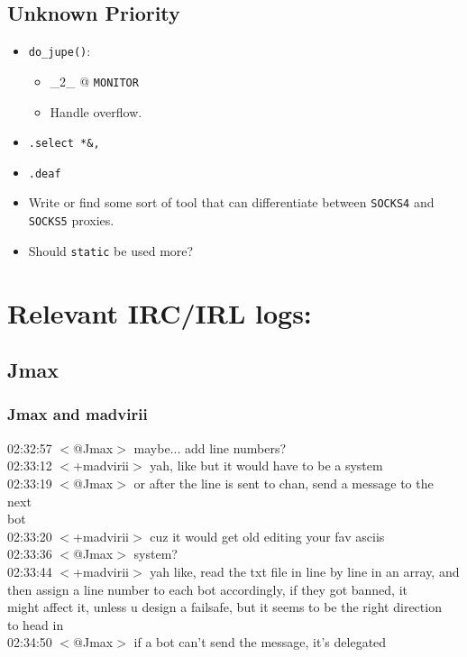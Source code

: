 \documentclass{article}
\begin{document}
\subsection{Unknown Priority}\label{Unknown Priority}
\begin{itemize}
\item {\tt do\_jupe()}:
\begin{itemize}
\item \_2\_ @ {\tt MONITOR}
\item Handle overflow.
\end{itemize}
\item {\tt .select *\&,}
\item {\tt .deaf}
\item Write or find some sort of tool that can differentiate between {\tt SOCKS4} and {\tt SOCKS5} proxies.
\item Should {\tt static} be used more?
\end{itemize}
\section{Relevant IRC/IRL logs:}\label{Relevant IRC/IRL logs:}
\subsection{Jmax}\label{Jmax}
\subsubsection{Jmax and madvirii}\label{Jmax and madvirii}
02:32:57 $<$@Jmax$>$ maybe... add line numbers?\\
02:33:12 $<$+madvirii$>$ yah, like but it would have to be a system\\
02:33:19 $<$@Jmax$>$ or after the line is sent to chan, send a message to the next\\\indent bot\\
02:33:20 $<$+madvirii$>$ cuz it would get old editing your fav asciis\\
02:33:36 $<$@Jmax$>$ system?\\
02:33:44 $<$+madvirii$>$ yah like, read the txt file in line by line in an array, and\\\indent then assign a line number to each bot accordingly, if they got banned, it\\\indent might affect it, unless u design a failsafe, but it seems to be the right direction\\\indent to head in\\
02:34:50 $<$@Jmax$>$ if a bot can't send the message, it's delegated
\end{document}
